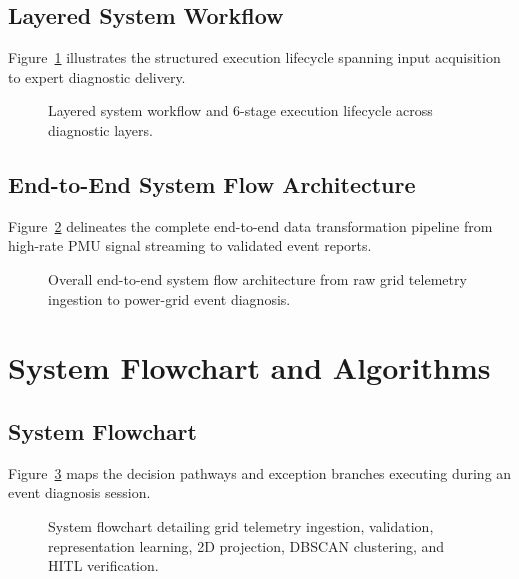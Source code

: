 \documentclass[12pt,a4paper]{report}
\begin{document}
\subsection{Layered System Workflow}
Figure~\ref{fig:arch_workflow} illustrates the structured execution lifecycle spanning input acquisition to expert diagnostic delivery.

\begin{figure}[H]
    \centering
    \caption{Layered system workflow and 6-stage execution lifecycle across diagnostic layers.}
    \label{fig:arch_workflow}
\end{figure}

\subsection{End-to-End System Flow Architecture}
Figure~\ref{fig:system_flow} delineates the complete end-to-end data transformation pipeline from high-rate PMU signal streaming to validated event reports.

\begin{figure}[H]
    \centering
    \caption{Overall end-to-end system flow architecture from raw grid telemetry ingestion to power-grid event diagnosis.}
    \label{fig:system_flow}
\end{figure}

\section{System Flowchart and Algorithms}

\subsection{System Flowchart}
Figure~\ref{fig:multiagent_flowchart} maps the decision pathways and exception branches executing during an event diagnosis session.

\begin{figure}[H]
    \centering
    \caption{System flowchart detailing grid telemetry ingestion, validation, representation learning, 2D projection, DBSCAN clustering, and HITL verification.}
    \label{fig:multiagent_flowchart}
\end{figure}
\end{document}
